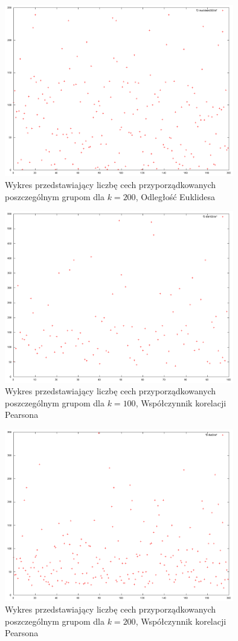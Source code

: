 \documentclass{classrep}
\begin{document}
\begin{figure}
  \centering
  \includegraphics[width=10cm]{img/euclidean200.png}
  \caption{Wykres przedstawiający liczbę cech przyporządkowanych poszczególnym
grupom dla $k=200$, Odległość Euklidesa}
  \label{euclidean.200}
\end{figure}


\begin{figure}
  \centering
  \includegraphics[width=10cm]{img/pearson100.png}
  \caption{Wykres przedstawiający liczbę cech przyporządkowanych poszczególnym
grupom dla $k=100$, Współczynnik korelacji Pearsona}
  \label{pearson.100}
\end{figure}

\begin{figure}
  \centering
  \includegraphics[width=10cm]{img/pearson200.png}
  \caption{Wykres przedstawiający liczbę cech przyporządkowanych poszczególnym
grupom dla $k=200$, Współczynnik korelacji Pearsona}
  \label{pearson.200}
\end{figure}
\end{document}
